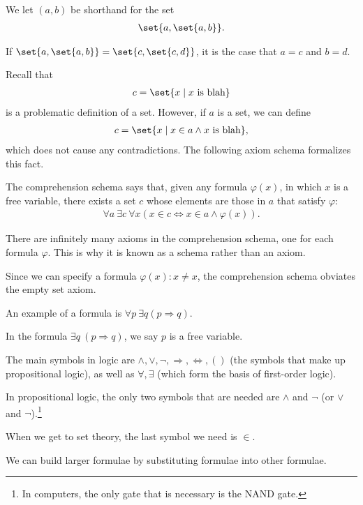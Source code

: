 \documentclass[10pt]{mypackage}
\begin{document}
\begin{definition}
  We let $(a,b)$ be shorthand for the set
  \begin{align*}
    \set{a,\set{a,b}}.
  \end{align*}
\end{definition}
\begin{exercise}
  If $\set{a,\set{a,b}} = \set{c,\set{c,d}}$, it is the case that $a=c$ and $b = d$.
\end{exercise}
Recall that
\begin{align*}
  c = \set{x\mid x\text{ is blah}}
\end{align*}
is a problematic definition of a set. However, if $a$ is a set, we can define
\begin{align*}
  c = \set{x\mid x\in a \wedge x\text{ is blah}},
\end{align*}
which does not cause any contradictions. The following axiom schema formalizes this fact.
\begin{axiom}
  The comprehension schema says that, given any formula $\varphi(x)$, in which $x$ is a free variable, there exists a set $c$ whose elements are those in $a$ that satisfy $\varphi$:
  \begin{align*}
    \forall a\:\exists c\:\forall x\left(x\in c\Leftrightarrow x\in a\wedge \varphi(x)\right).
  \end{align*}
\end{axiom}
\begin{remark}
  There are infinitely many axioms in the comprehension schema, one for each formula $\varphi$. This is why it is known as a schema rather than an axiom.
\end{remark}
\begin{remark}
  Since we can specify a formula $\varphi(x): x\neq x$, the comprehension schema obviates the empty set axiom.
\end{remark}
\begin{example}
  An example of a formula is $\forall p\:\exists q(p\Rightarrow q)$.\newline

  In the formula $\exists q\:\left(p\Rightarrow q\right)$, we say $p$ is a free variable.\newline

  The main symbols in logic are $\wedge,\vee,\lnot,\Rightarrow,\Leftrightarrow,()$ (the symbols that make up propositional logic), as well as $\forall,\exists$ (which form the basis of first-order logic).\newline

  In propositional logic, the only two symbols that are needed are $\wedge$ and $\lnot$ (or $\vee$ and $\lnot$).\footnote{In computers, the only gate that is necessary is the NAND gate.}\newline

  When we get to set theory, the last symbol we need is $\in$.\newline

  We can build larger formulae by substituting formulae into other formulae.
\end{example}
\end{document}
